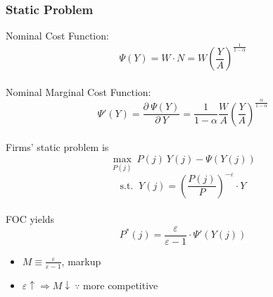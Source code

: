 \documentclass{article}
\begin{document}
\subsubsection{Static Problem}
Nominal Cost Function:
$$\Psi (Y) = W\cdot N = W\left(\frac{Y}{A}\right)^{\frac{1}{1-\alpha}}$$
\\
Nominal Marginal Cost Function:
$$\Psi'(Y) = \frac{\partial\ \Psi(Y)}{\partial\ Y} = \frac{1}{1-\alpha}\frac{W}{A}\left(\frac{Y}{A}\right)^{\frac{\alpha}{1-\alpha}}$$
\\
Firms' static problem is
$$\max_{P(j)}\ P(j)\ Y(j) - \Psi(Y(j))$$
$${\text{s.t. }}\ Y(j) = \left(\frac{P(j)}{P}\right)^{-\varepsilon} \cdot Y$$
\\
FOC yields
$$P^*(j) = \frac{\varepsilon}{\varepsilon - 1}\cdot \Psi'(Y(j))$$
\begin{itemize}
    \item $M \equiv \frac{\varepsilon}{\varepsilon - 1}$, markup
    \item $\varepsilon \uparrow \Rightarrow M \downarrow\ \because$ more competitive
\end{itemize}
\end{document}
